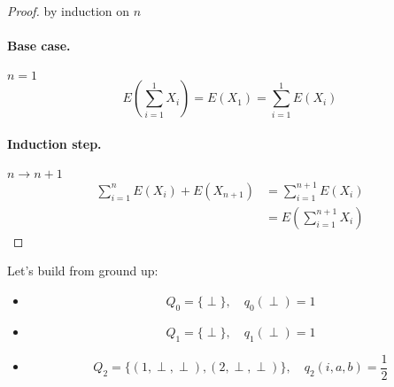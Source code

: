 \documentclass{article}
\begin{document}
\begin{tasks}
{            \begin{proof}
                by induction on \(n\)
                
                \paragraph*{Base case.} \(n = 1\)
                \begin{displaymath}
                    E\left(\sum_{i=1}^{1}X_i\right) 
                    = E(X_1)
                    = \sum_{i=1}^{1}E(X_i)
                \end{displaymath}
                
                \paragraph*{Induction step.} \(n \to n+1\)
                \begin{displaymath}
                    \begin{aligned}
                        \sum_{i=1}^{n}E(X_i) + E(X_{n+1})
                        &= \sum_{i=1}^{n+1}E(X_i) \\
                        &= E\left(\sum_{i=1}^{n+1}X_i\right)
                    \end{aligned}
                \end{displaymath}
            \end{proof}
        }
        \item {
            Let's build from ground up:
            \begin{itemize}
                \item {
                    \begin{displaymath}
                        Q_0 = \{\perp\},\quad q_0(\perp) = 1
                    \end{displaymath}
                }
                \item {
                    \begin{displaymath}
                        Q_1 = \{\perp\},\quad q_1(\perp) = 1
                    \end{displaymath}
                }
                \item {
                    \begin{displaymath}
                        Q_2 = \{(1, \perp, \perp), (2, \perp, \perp)\},\quad q_2(i, a, b) = \frac{1}{2}
                    \end{displaymath}
}
\end{itemize}}
\end{tasks}
\end{document}
